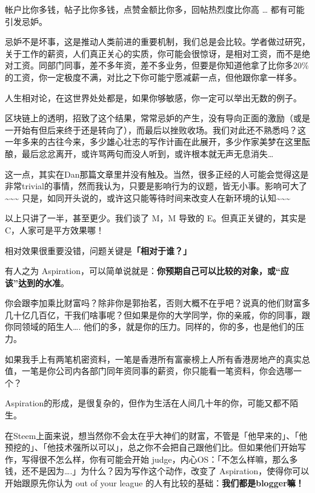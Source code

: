 \documentclass[]{ctexbook}
\begin{document}
帐户比你多钱，帖子比你多钱，点赞金额比你多，回帖热烈度比你高 \ldots{} 都有可能引发忌妒。

忌妒不是坏事，这是推动人类前进的重要机制，我们总是会比较。学者做过研究，关于工作的薪资，人们真正关心的实质，你可能会很惊讶，是相对工资，而不是绝对工资。同部门同事，差不多年资，差不多业务，但要是你知道他拿了比你多20\%的工资，你一定极度不满，对比之下你可能宁愿减薪一点，但他跟你拿一样多。

人生相对论，在这世界处处都是，如果你够敏感，你一定可以举出无数的例子。

区块链上的透明，招致了这个结果，常常忌妒的产生，没有导向正面的激励（或是一开始有但后来终于还是转向了），而最后以挫败收场。我们对此还不熟悉吗？这一年多来的古往今来，多少雄心壮志的写作计画在此展开，多少作家美梦在这里酝酿，最后忿忿离开，或许骂两句而没人听到，或许根本就无声无息消失\ldots{}

这一点，其实在Dan那篇文章里并没有触及。当然，很多正经的人可能会觉得这是非常trivial的事情，然而我认为，只要是影响行为的议题，皆无小事。影响可大了\textasciitilde{}\textasciitilde{}\textasciitilde{} 只是，如同开头说的，或许这只能等待时间来改变人在新环境的认知\textasciitilde{}\textasciitilde{}\textasciitilde{}

以上只讲了一半，甚至更少。我们谈了 M，M 导致的 E。但真正关键的，其实是 C，人家可是平方效果哪！

相对效果很重要没错，问题关键是\textbf{「相对于谁？」}

有人之为 Aspiration，可以简单说就是：\textbf{你预期自己可以比较的对象，或``应该''达到的水准}。

你会跟李加乘比财富吗？除非你是郭抬茗，否则大概不在乎吧？说真的他们财富多几十亿几百亿，干我们啥事呢？但如果是你的大学同学，你的亲戚，你的同事，跟你同领域的陌生人\ldots{}. 他们的多，就是你的压力。同样的，你的多，也是他们的压力。

如果我手上有两笔机密资料，一笔是香港所有富豪榜上人所有香港房地产的真实总值，一笔是你公司内各部门同年资同事的薪资，你只能看一笔资料，你会选哪一个？

Aspiration的形成，是很复杂的，但作为生活在人间几十年的你，可能又都不陌生。

在Steem上面来说，想当然你不会太在乎大神们的财富，不管是「他早来的」、「他预挖的」、「他技术强所以可以」，总之你不会把自己跟他们比。但如果他们开始写作，写得很不怎么样，你有可能会开始 judge，内心OS：「不怎么样嘛，那么多钱，还不是因为\ldots{}.」为什么？因为写作这个动作，改变了 Aspiration，使得你可以开始跟原先你认为 out of your league 的人有比较的基础：\textbf{我们都是blogger嘛！}
\end{document}
